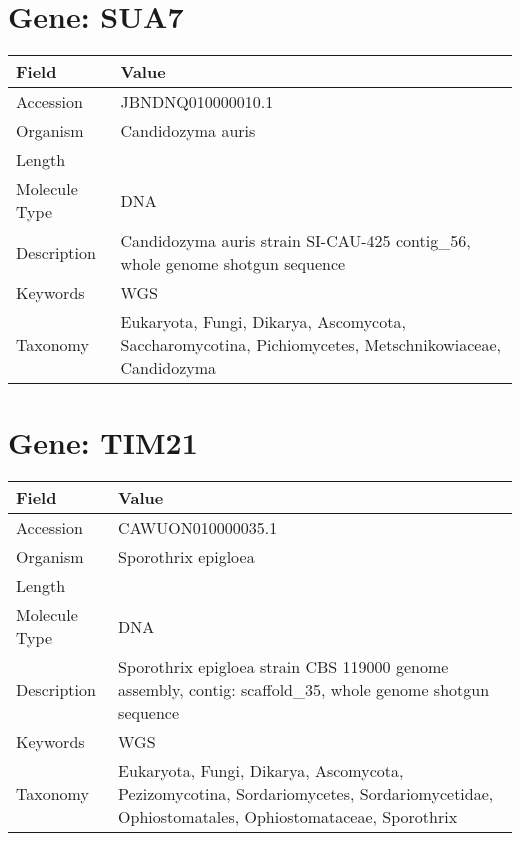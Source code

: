 \documentclass[10pt]{article}
\begin{document}
\section*{Gene: SUA7}
{\footnotesize
\begin{longtable}{>{\raggedright\arraybackslash}p{4.5cm} >{\raggedright\arraybackslash}p{11.5cm}}
\textbf{Field} & \textbf{Value} \\
\hline
Accession & JBNDNQ010000010.1 \\
Organism & Candidozyma auris \\
Length & 776911 \\
Molecule Type & DNA \\
Description & Candidozyma auris strain SI-CAU-425 contig\_56, whole genome shotgun sequence \\
Keywords & WGS \\
Taxonomy & Eukaryota, Fungi, Dikarya, Ascomycota, Saccharomycotina, Pichiomycetes, Metschnikowiaceae, Candidozyma \\
\end{longtable}
}


\section*{Gene: TIM21}
{\footnotesize
\begin{longtable}{>{\raggedright\arraybackslash}p{4.5cm} >{\raggedright\arraybackslash}p{11.5cm}}
\textbf{Field} & \textbf{Value} \\
\hline
Accession & CAWUON010000035.1 \\
Organism & Sporothrix epigloea \\
Length & 172627 \\
Molecule Type & DNA \\
Description & Sporothrix epigloea strain CBS 119000 genome assembly, contig: scaffold\_35, whole genome shotgun sequence \\
Keywords & WGS \\
Taxonomy & Eukaryota, Fungi, Dikarya, Ascomycota, Pezizomycotina, Sordariomycetes, Sordariomycetidae, Ophiostomatales, Ophiostomataceae, Sporothrix \\
\end{longtable}
}
\end{document}
